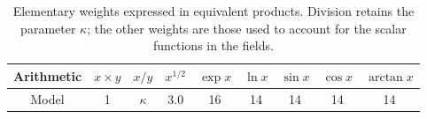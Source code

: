\begin{table}[htbp]
\centering
\small
\caption{Elementary weights expressed in equivalent products. Division retains the parameter $\kappa$; the other weights are those used to account for the scalar functions in the fields.}
\label{tab:elementary-products}
\begin{tabular}{ccccccccc}
\toprule
Arithmetic & $x\times y$ & $x/y$ & $x^{1/2}$ & $\exp x$ & $\ln x$ & $\sin x$ & $\cos x$ & $\arctan x$\\
\midrule
Model & 1 & $\kappa$ & 3.0 & 16 & 14 & 14 & 14 & 14\\
\bottomrule
\end{tabular}
\end{table}
